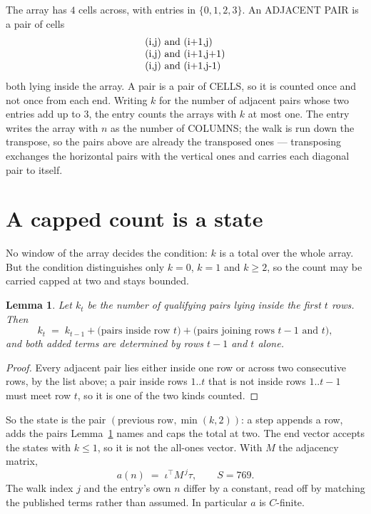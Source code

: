 \documentclass[11pt,a4paper]{article}
\theoremstyle{plain}
\newtheorem{lemma}[theorem]{Lemma}
\theoremstyle{definition}
\begin{document}
The array has $4$ cells across, with entries in $\{0,1,2,3\}$. An ADJACENT PAIR is a pair of cells
\[
\begin{array}{l}
$(i,j)\text{ and }(i{+}1,j)$ \\
$(i,j)\text{ and }(i{+}1,j{+}1)$ \\
$(i,j)\text{ and }(i{+}1,j{-}1)$ \\
\end{array}
\]
both lying inside the array. A pair is a pair of CELLS, so it is counted once and not once from
each end. Writing $k$ for the number of adjacent pairs whose two entries add up to $3$, the
entry counts the arrays with $k$ at most one. The entry writes the array with $n$ as the number of COLUMNS; the walk is run down the transpose, so the pairs above are already the transposed ones --- transposing exchanges the horizontal pairs with the vertical ones and carries each diagonal pair to itself.

\section{A capped count is a state}

No window of the array decides the condition: $k$ is a total over the whole array. But the
condition distinguishes only $k=0$, $k=1$ and $k\ge2$, so the count may be carried capped at
two and stays bounded.

\begin{lemma}\label{lem:cap}
Let $k_t$ be the number of qualifying pairs lying inside the first $t$ rows. Then
\[
k_{t}\;=\;k_{t-1}+\bigl(\text{pairs inside row } t\bigr)
+\bigl(\text{pairs joining rows } t-1 \text{ and } t\bigr),
\]
and both added terms are determined by rows $t-1$ and $t$ alone.
\end{lemma}

\begin{proof}
Every adjacent pair lies either inside one row or across two consecutive rows, by the list
above; a pair inside rows $1..t$ that is not inside rows $1..t-1$ must meet row $t$, so it is
one of the two kinds counted.
\end{proof}

So the state is the pair $(\text{previous row},\min(k,2))$: a step appends a row, adds the
pairs Lemma~\ref{lem:cap} names and caps the total at two. The end vector accepts the states
with $k\le1$, so it is not the all-ones vector. With $M$ the adjacency matrix,
\[
a(n)\;=\;\iota^{\!\top}M^{\,j}\tau ,\qquad S=769.
\]
The walk index $j$ and the entry's own $n$ differ by a constant, read off by matching the
published terms rather than assumed. In particular $a$ is $C$-finite.
\end{document}
